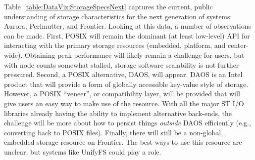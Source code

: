 Table~\ref{table:DataViz:StorageSpecsNext} captures the current, public
understanding of storage characteristics for the next generation of
systems: Aurora, Perlmutter, and Frontier.
%
Looking at this data, a number of observations can be made. First, POSIX will
remain the dominant (at least low-level) API for interacting with the primary
storage resources (embedded, platform, and center-wide). Obtaining peak
performance will likely remain a challenge for users, but with node counts
somewhat stalled, storage software scalability is not further pressured.
%
Second, a POSIX alternative, DAOS, will appear. DAOS is an Intel
product that will provide a form of globally accessible key-value
style of storage. However, a POSIX ``veneer'', or compatibility layer,
will be provided that will give users an easy way to make use of the
resource. With all the major ST I/O libraries already having the ability
to implement alternative back-ends, the challenge will be more about how
to persist things \emph{outside} DAOS efficiently (e.g., converting back
to POSIX files).
%
Finally, there will still be a non-global, embedded storage resource on
Frontier. The best ways to use this resource are unclear, but systems
like UnifyFS could play a role.

